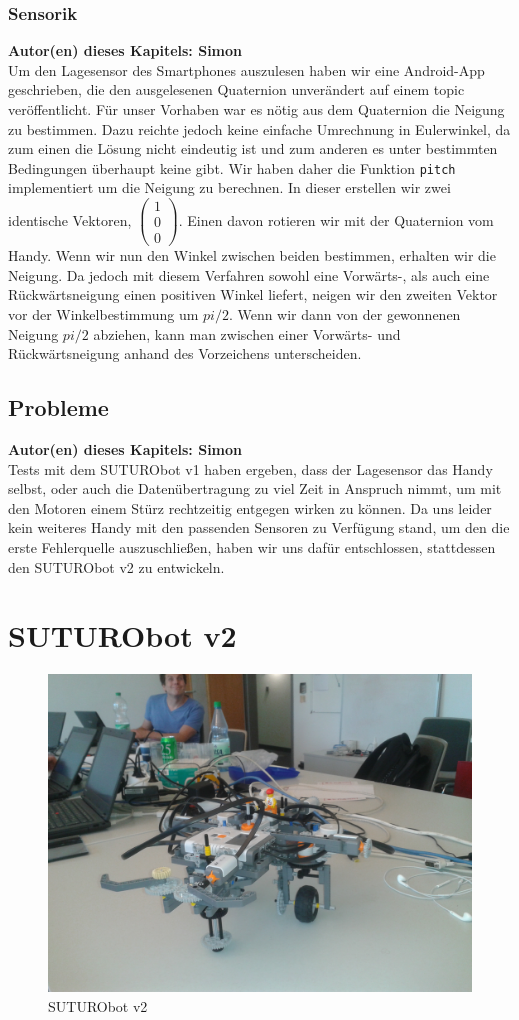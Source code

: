 \documentclass[8pt]{article}
\newcommand{\secauthor}[1]{\textbf{Autor(en) dieses Kapitels: {#1}}\\}
\begin{document}
\subsubsection{Sensorik} 
\secauthor{Simon}
Um den Lagesensor des Smartphones auszulesen haben wir eine Android-App geschrieben, die den ausgelesenen Quaternion unverändert auf einem topic veröffentlicht.
Für unser Vorhaben war es nötig aus dem Quaternion die Neigung zu bestimmen. Dazu reichte jedoch keine einfache Umrechnung in Eulerwinkel, da zum einen die Lösung nicht eindeutig ist und zum anderen es unter bestimmten Bedingungen überhaupt keine gibt. Wir haben daher die Funktion \texttt{pitch} implementiert um die Neigung zu berechnen. In dieser erstellen wir zwei identische Vektoren, $\left( \begin{array}{c} 1 \\ 0 \\ 0
\end{array} \right)$. Einen davon rotieren wir mit der Quaternion vom Handy. Wenn wir nun den Winkel zwischen beiden bestimmen, erhalten wir die Neigung. Da jedoch mit diesem Verfahren sowohl eine Vorwärts-, als auch eine Rückwärtsneigung einen positiven Winkel liefert, neigen wir den zweiten Vektor vor der Winkelbestimmung um $pi / 2$. Wenn wir dann von der gewonnenen Neigung $pi / 2$ abziehen, kann man zwischen einer Vorwärts- und Rückwärtsneigung anhand des Vorzeichens unterscheiden.

\subsection{Probleme} 
\secauthor{Simon}
Tests mit dem SUTURObot v1 haben ergeben, dass der Lagesensor das Handy selbst, oder auch die Datenübertragung zu viel Zeit in Anspruch nimmt, um mit den Motoren einem Stürz rechtzeitig entgegen wirken zu können. Da uns leider kein weiteres Handy mit den passenden Sensoren zu Verfügung stand, um den die erste Fehlerquelle auszuschließen, haben wir uns dafür entschlossen, stattdessen den SUTURObot v2 zu entwickeln.

\section{SUTURObot v2}
\begin{figure}[h]
  \begin{center}
    \includegraphics[width=.5\textwidth]{pictures/SUTURObot-v2.jpg}
  \end{center}
  \caption{SUTURObot v2}
  \label{fig:SUTURObot2}
\end{figure}
\end{document}
